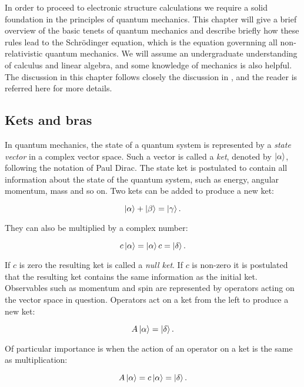 In order to proceed to electronic structure calculations
we require a solid foundation in the principles of quantum mechanics.
This chapter will give a brief overview of the basic tenets
of quantum mechanics and describe briefly how these rules lead
to the Schr\"{o}dinger equation, which is the equation governning
all non-relativistic quantum mechanics.
We will assume an undergraduate understanding of calculus and linear algebra,
and some knowledge of mechanics is also helpful.
The discussion in this chapter follows closely the discussion in
\parencite[Sakurai][pages 10-76]{sakurai1995modern},
and the reader is referred here for more details.

\subsection{Kets and bras}
In quantum mechanics, the state of a quantum system 
is represented by a \textit{state vector}
in a complex vector space. Such a vector is called a \textit{ket}, denoted
by $\ket{\alpha}$, following the notation of Paul Dirac. 
The state ket is postulated to contain all information
about the state of the quantum system, such as energy, angular momentum,
mass and so on. Two kets can be added to produce a new ket:

\begin{equation}
\ket{\alpha} + \ket{\beta} = \ket{\gamma} .
\end{equation}

They can also be multiplied by a complex number:

\begin{equation}
c\ket{\alpha} = \ket{\alpha}c = \ket{\delta} .
\end{equation}

If $c$ is zero the resulting ket is called a \textit{null ket}.
If $c$ is non-zero it is postulated that the resulting ket contains
the same information as the initial ket.
\newline
Observables such as momentum and spin are represented by operators
acting on the vector space in question. Operators
act on a ket from the left to produce a new ket:

\begin{equation}
A \ket{\alpha} = \ket{\delta} .
\end{equation}

Of particular importance is when the action of an operator
on a ket is the same as multiplication:

\begin{equation}
A \ket{\alpha} = c\ket{\alpha} = \ket{\delta} .
\end{equation}

